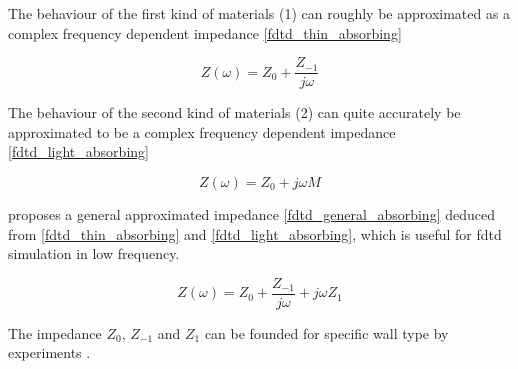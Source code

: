 The behaviour of the first kind of materials (1) can roughly be approximated as a complex frequency dependent impedance \autoref{fdtd_thin_absorbing}

\begin{equation}\label{fdtd_thin_absorbing}
Z(\omega)= Z_0+\frac{Z_{-1}}{j\omega}
\end{equation}

         \startexplain
    \stopexplain

The behaviour of the second kind of materials (2) can quite accurately be approximated to be a complex frequency dependent impedance \autoref{fdtd_light_absorbing}

\begin{equation}\label{fdtd_light_absorbing}
Z(\omega)= Z_0+j\omega M
\end{equation}

         \startexplain
    \stopexplain

 \citep{finiteproblems} proposes a general approximated impedance \autoref{fdtd_general_absorbing} deduced from \autoref{fdtd_thin_absorbing} and \autoref{fdtd_light_absorbing}, which is useful for \gls{fdtd} simulation in low frequency. 

\begin{equation}\label{fdtd_general_absorbing}
Z(\omega)= Z_0+\frac{Z_{-1}}{j\omega}+j\omega Z_1
\end{equation}

         \startexplain
    \stopexplain

The impedance $Z_0$, $Z_{-1}$ and $Z_1$ can be founded for specific wall type by experiments \citep{finiteproblems}. \\


